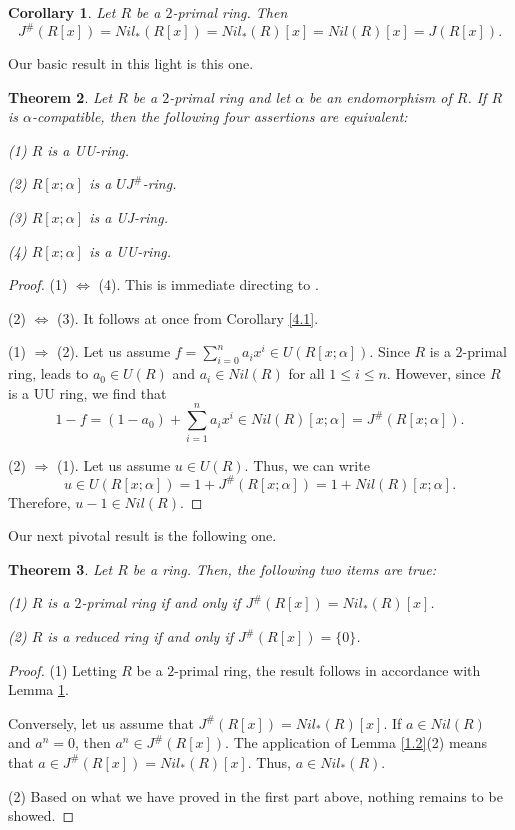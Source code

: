 \documentclass[12pt]{amsart}
\newtheorem{theorem}{Theorem}[section]
\newtheorem{corollary}[theorem]{Corollary}
\theoremstyle{definition}
\begin{document}
\begin{corollary}\label{2.40}
Let \( R \) be a \(2\)-primal ring. Then
\[
	J^{\#}(R[x])=Nil_*(R[x])=Nil_*(R)[x]=Nil(R)[x]=J(R[x]).
\]
\end{corollary}

Our basic result in this light is this one.

\begin{theorem}\label{skew polynomial}
Let \( R \) be a \(2\)-primal ring and let \( \alpha \) be an endomorphism of \( R \). If \( R \) is \( \alpha \)-compatible, then the following four assertions are equivalent:

(1) $R$ is a UU-ring.
	
(2) $R[x; \alpha]$ is a $UJ^{\#}$-ring.
			
(3) $R[x; \alpha]$ is a UJ-ring.
	
(4) $R[x; \alpha]$ is a UU-ring.
\end{theorem}

\begin{proof}
(1) $\Leftrightarrow$ (4). This is immediate directing to \cite[Theorem 2.11]{karimi}.
	
(2) $\Leftrightarrow$ (3). It follows at once from Corollary \ref{4.1}.
	
(1) $\Rightarrow$ (2). Let us assume $f=\sum_{i=0}^{n}a_ix^i \in U(R[x; \alpha])$. Since $R$ is a $2$-primal ring, \cite[Corollary 2.14]{Chenpr} leads to $a_0 \in U(R)$ and $a_i \in Nil(R)$ for all $1 \le i \le n$. However, since $R$ is a UU ring, we find that $$1 - f = (1 - a_0) + \sum_{i=1}^{n}a_ix^i \in Nil(R)[x; \alpha] = J^{\#}(R[x; \alpha]).$$
	
(2) $\Rightarrow$ (1). Let us assume $u \in U(R)$. Thus, we can write $$u \in U(R[x; \alpha]) = 1 + J^{\#}(R[x; \alpha]) = 1 + Nil(R)[x; \alpha].$$ Therefore, $u - 1 \in Nil(R)$.
\end{proof}

Our next pivotal result is the following one.

\begin{theorem}\label{thm 2 primal}
Let $R$ be a ring. Then, the following two items are true:
	
(1) $R$ is a $2$-primal ring if and only if $J^{\#}(R[x]) = Nil_*(R)[x]$.
	
(2) $R$ is a reduced ring if and only if $J^{\#}(R[x]) = \{0\}$.
\end{theorem}

\begin{proof}
(1) Letting $R$ be a $2$-primal ring, the result follows in accordance with Lemma \ref {2.40}.
	
Conversely, let us assume that $J^{\#}(R[x]) = Nil_*(R)[x]$. If $a \in Nil(R)$ and $a^n = 0$, then $a^n \in J^{\#}(R[x])$. The application of Lemma \ref{1.2}(2) means that $a \in J^{\#}(R[x]) = Nil_*(R)[x]$. Thus, $a \in Nil_*(R)$.
	
(2) Based on what we have proved in the first part above, nothing remains to be showed.
\end{proof}
\end{document}
